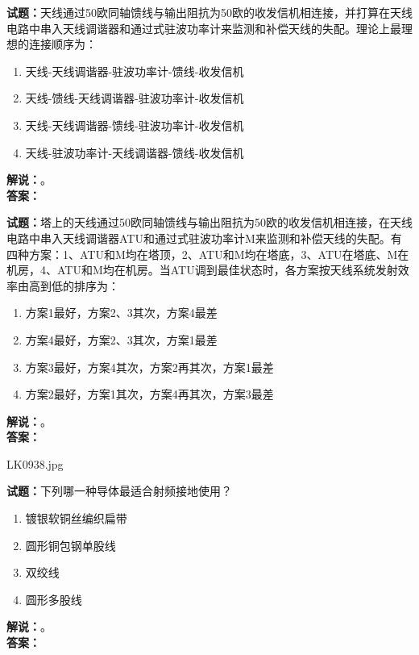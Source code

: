 \documentclass{ctexbook}
\begin{document}
\noindent\textbf{试题：}天线通过50欧同轴馈线与输出阻抗为50欧的收发信机相连接，并打算在天线电路中串入天线调谐器和通过式驻波功率计来监测和补偿天线的失配。理论上最理想的连接顺序为：
\begin{enumerate}[leftmargin=3em]
  \item 天线-天线调谐器-驻波功率计-馈线-收发信机
  \item 天线-馈线-天线调谐器-驻波功率计-收发信机
  \item 天线-天线调谐器-馈线-驻波功率计-收发信机
  \item 天线-驻波功率计-天线调谐器-馈线-收发信机
\end{enumerate}
\noindent\textbf{解说：}\textbf{}。\\\noindent\textbf{答案：}

\vspace{\baselineskip}

\noindent\textbf{试题：}塔上的天线通过50欧同轴馈线与输出阻抗为50欧的收发信机相连接，在天线电路中串入天线调谐器ATU和通过式驻波功率计M来监测和补偿天线的失配。有四种方案：1、ATU和M均在塔顶，2、ATU和M均在塔底，3、ATU在塔底、M在机房，4、ATU和M均在机房。当ATU调到最佳状态时，各方案按天线系统发射效率由高到低的排序为：
\begin{enumerate}[leftmargin=3em]
  \item 方案1最好，方案2、3其次，方案4最差
  \item 方案4最好，方案2、3其次，方案1最差
  \item 方案3最好，方案4其次，方案2再其次，方案1最差
  \item 方案2最好，方案1其次，方案4再其次，方案3最差
\end{enumerate}
\noindent\textbf{解说：}\textbf{}。\\\noindent\textbf{答案：}

\vspace{\baselineskip}

LK0938.jpg

\noindent\textbf{试题：}下列哪一种导体最适合射频接地使用？
\begin{enumerate}[leftmargin=3em]
  \item 镀银软铜丝编织扁带
  \item 圆形铜包钢单股线
  \item 双绞线
  \item 圆形多股线
\end{enumerate}
\noindent\textbf{解说：}\textbf{}。\\\noindent\textbf{答案：}

\vspace{\baselineskip}
\end{document}
